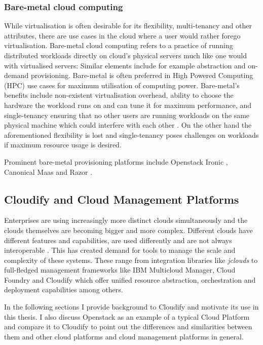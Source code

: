 \subsubsection{Bare-metal cloud computing}

While virtualisation is often desirable for its flexibility, multi-tenancy and other attributes, there are use cases in the cloud where a user would rather forego virtualisation. Bare-metal cloud computing refers to a practice of running distributed workloads directly on  cloud's physical servers much like one would with virtualised servers: Similar elements include for example abstraction and on-demand provisioning. Bare-metal is often preferred in High Powered Computing (HPC) use cases for maximum utilisation of computing power. Bare-metal's benefits include non-existent virtualisation overhead, ability to choose the hardware the workload runs on and can tune it for maximum performance, and single-tenancy ensuring that no other users are running workloads on the same physical machine which could interfere with each other \cite{baremetal}. On the other hand the aforementioned flexibility is lost and single-tenancy poses challenges on workloads if maximum resource usage is desired. 

Prominent bare-metal provisioning platforms include Openstack Ironic \cite{ironic}, Canonical Maas \cite{MaaS} and Razor \cite{razor}.

\subsection{Cloudify and Cloud Management Platforms}

Enterprises are using increasingly more distinct clouds simultaneously \cite{stateofthecloud} and the clouds themselves are becoming bigger and more complex. Different clouds have different features and capabilities, are used differently and are not always interoperable \cite{multicloudprovisioning}. This has created demand for tools to manage the scale and complexity of these systems. These range from integration libraries like \textit{jclouds} \cite{jclouds} to full-fledged management frameworks like IBM Multicloud Manager, Cloud Foundry and Cloudify \cite{ibmmulticloud,cloudfoundry,cloudify} which offer unified resource abstraction, orchestration and deployment capabilities among others.

In the following sections I provide background to Cloudify and motivate its use in this thesis. I also discuss Openstack as an example of a typical Cloud Platform and compare it to Cloudify to point out the differences and similarities between them and other cloud platforms and cloud management platforms in general.

